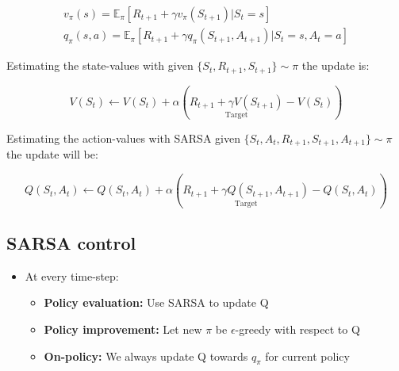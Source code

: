 	\begin{equation}
	\begin{aligned}
		 		v_\pi(s) = \mathbb{E}_\pi[R_{t+1} + \gamma v_\pi(S_{t+1})|S_t =s] \\
		 		q_\pi(s,a) = \mathbb{E}_\pi[R_{t+1}+ \gamma q_\pi(S_{t+1}, A_{t+1}) | S_t = s, A_t = a]
	\end{aligned}
	\end{equation}

Estimating the state-values with given $\{ S_t, R_{t+1},S_{t+1}\} \sim \pi$ the update is:

	\begin{equation}
		V(S_t) \leftarrow V(S_t) + \alpha (\underset{\text{Target}}{R_{t+1}+\gamma V(S_{t+1}) }- V(S_t))  
	\end{equation}  

Estimating the action-values with SARSA given $\{S_t,A_t,R_{t+1},S_{t+1},A_{t+1}\} \sim \pi$ the update will be:

	\begin{equation}
		Q(S_t,A_t) \leftarrow Q(S_t,A_t) + \alpha (\underset{\text{Target}}{R_{t+1} + \gamma Q(S_{t+1},A_{t+1})}-Q(S_t,A_t))
	\end{equation}

\subsection{SARSA control}

\begin{itemize}
	\item At every time-step:
	\begin{itemize}
	\item \textbf{Policy evaluation: } Use SARSA to update Q
	\item \textbf{Policy improvement: } Let new $\pi$ be $\epsilon$-greedy with respect to Q
	\item \textbf{On-policy: } We always update Q towards $q_\pi$ for current policy
\end{itemize}
\end{itemize}


